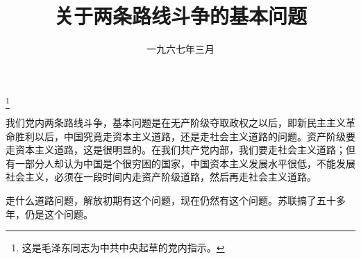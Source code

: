 
\title{关于两条路线斗争的基本问题}
\date{一九六七年三月}
\thanks{这是毛泽东同志为中共中央起草的党内指示。}
\maketitle


我们党内两条路线斗争，基本问题是在无产阶级夺取政权之以后，即新民主主义革命胜利以后，中国究竟走资本主义道路，还是走社会主义道路的问题。资产阶级要走资本主义道路，这是很明显的。在我们共产党内部，我们要走社会主义道路；但有一部分人却认为中国是个很穷困的国家，中国资本主义发展水平很低，不能发展社会主义，必须在一段时间内走资产阶级道路，然后再走社会主义道路。

走什么道路问题，解放初期有这个问题，现在仍然有这个问题。苏联搞了五十多年，仍是这个问题。
